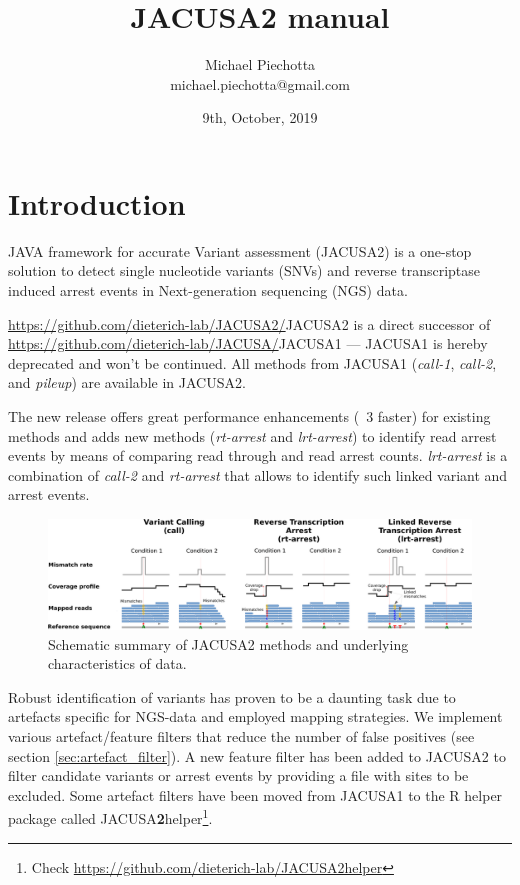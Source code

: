 \documentclass[10pt,a4paper]{article} \usepackage[utf8]{inputenc}
\title{JACUSA2 manual}
\author{Michael Piechotta \\ michael.piechotta@gmail.com}
\date{9th, October, 2019}
\begin{document}
\newcommand{\call}[1]{\textit{call-#1}\xspace}
\newcommand{\pileup}{\textit{pileup}\xspace}
\newcommand{\rtarrest}{\textit{rt-arrest}\xspace}
\newcommand{\lrtarrest}{\textit{lrt-arrest}\xspace}
\maketitle
\tableofcontents
\listoftodos
\newpage
\section{Introduction}
JAVA framework for accurate Variant assessment (JACUSA2) is a one-stop solution to detect single
nucleotide variants (SNVs) and reverse transcriptase induced arrest events in Next-generation
sequencing (NGS) data.

\url{https://github.com/dieterich-lab/JACUSA2/}{JACUSA2} is a direct successor of
\url{https://github.com/dieterich-lab/JACUSA/}{JACUSA1} --- JACUSA1 is hereby deprecated and won't
be continued. All methods from JACUSA1 (\call{1}, \call{2}, and \pileup) are available in JACUSA2.

The new release offers great performance enhancements (~3 faster) for existing methods
and adds new methods (\rtarrest and \lrtarrest) to identify read arrest events by means of comparing 
read through and read arrest counts. \lrtarrest is a combination of \call{2} and \rtarrest that 
allows to identify such linked variant and arrest events.
\begin{figure}[ht]
  \centering
  \includegraphics[width=\textwidth]{figures/jacusa_methods_cropped}
  \caption{Schematic summary of JACUSA2 methods and underlying characteristics of data.}
  \label{fig:methods}
\end{figure}
Robust identification of variants has proven to be a daunting task due to artefacts specific for
NGS-data and employed mapping strategies. We implement various artefact/feature filters that reduce
the number of false positives (see section \ref{sec:artefact_filter}). A new feature filter has been
added to JACUSA2 to filter candidate variants or arrest events by providing a file with sites to be
excluded.
Some artefact filters have been moved from JACUSA1 to the R helper package called JACUSA\textbf{2}helper\footnote{Check
\url{https://github.com/dieterich-lab/JACUSA2helper}}.
\end{document}
